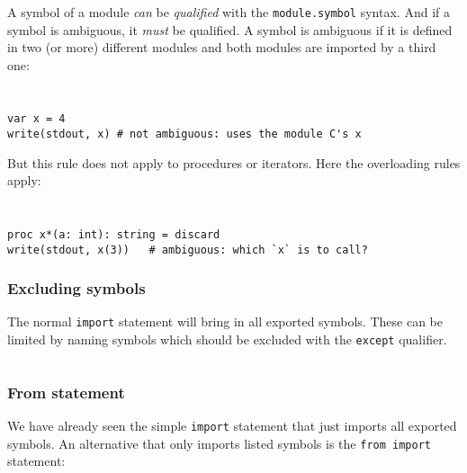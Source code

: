 A symbol of a module \emph{can} be \emph{qualified} with the
\texttt{module.symbol} syntax. And if a symbol is ambiguous, it
\emph{must} be qualified. A symbol is ambiguous if it is defined in two
(or more) different modules and both modules are imported by a third
one:

\begin{verbatim}
\end{verbatim}

\begin{verbatim}
\end{verbatim}

\begin{verbatim}
var x = 4
write(stdout, x) # not ambiguous: uses the module C's x
\end{verbatim}

But this rule does not apply to procedures or iterators. Here the
overloading rules apply:

\begin{verbatim}
\end{verbatim}

\begin{verbatim}
\end{verbatim}

\begin{verbatim}
proc x*(a: int): string = discard
write(stdout, x(3))   # ambiguous: which `x` is to call?
\end{verbatim}

\hypertarget{excluding-symbols}{%
\subsubsection{Excluding symbols}\label{excluding-symbols}}

The normal \texttt{import} statement will bring in all exported symbols.
These can be limited by naming symbols which should be excluded with the
\texttt{except} qualifier.

\begin{verbatim}
\end{verbatim}

\hypertarget{from-statement}{%
\subsubsection{From statement}\label{from-statement}}

We have already seen the simple \texttt{import} statement that just
imports all exported symbols. An alternative that only imports listed
symbols is the \texttt{from\ import} statement:

